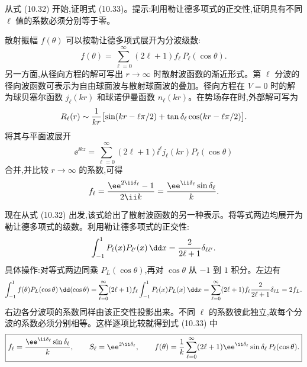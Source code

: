 \begin{question}
从式 (10.32) 开始,证明式 (10.33)。提示:利用勒让德多项式的正交性,证明具有不同 $\ell$ 值的系数必须分别等于零。

\par\smallskip
{}

\begin{solution}
散射振幅 $f(\theta)$ 可以按勒让德多项式展开为分波级数:
\[
f(\theta)=\sum_{\ell=0}^{\infty}(2\ell+1)f_\ell\,P_\ell(\cos\theta).
\]
另一方面,从径向方程的解可写出 $r\to\infty$ 时散射波函数的渐近形式。第 $\ell$ 分波的径向波函数可表示为自由球面波与散射球面波的叠加。径向方程在 $V=0$ 时的解为球贝塞尔函数 $j_\ell(kr)$ 和球诺伊曼函数 $n_\ell(kr)$。在势场存在时,外部解可写为
\[
R_\ell(r)\sim {1\over kr}\bigl[\sin(kr-\ell\pi/2)+\tan\delta_\ell\cos(kr-\ell\pi/2)\bigr].
\]
将其与平面波展开
\[
\ee^{\ii kz}=\sum_{\ell=0}^{\infty}(2\ell+1)\ii^\ell j_\ell(kr)P_\ell(\cos\theta)
\]
合并,并比较 $r\to\infty$ 的系数,可得
\[
f_\ell={\ee^{2\ii\delta_\ell}-1\over2\ii k}={\ee^{\ii\delta_\ell}\sin\delta_\ell\over k}.
\]

现在从式 (10.32) 出发,该式给出了散射波函数的另一种表示。将等式两边均展开为勒让德多项式的级数。利用勒让德多项式的正交性:
\[
\int_{-1}^{1}P_\ell(x)P_{\ell'}(x)\,\dd x={2\over2\ell+1}\delta_{\ell\ell'}.
\]
具体操作:对等式两边同乘 $P_L(\cos\theta)$,再对 $\cos\theta$ 从 $-1$ 到 $1$ 积分。左边有
\[
\int_{-1}^1 f(\theta)P_L(\cos\theta)\,\dd(\cos\theta)
=\sum_{\ell=0}^\infty(2\ell+1)f_\ell\int_{-1}^1 P_\ell(x)P_L(x)\,\dd x
=\sum_{\ell=0}^\infty(2\ell+1)f_\ell{2\over2\ell+1}\delta_{\ell L}=2f_L.
\]
右边各分波项的系数同样由该正交性投影出来。不同 $\ell$ 的系数彼此独立,故每个分波的系数必须分别相等。这样逐项比较就得到式 (10.33) 中
\[
\boxed{f_\ell={\ee^{\ii\delta_\ell}\sin\delta_\ell\over k},\qquad S_\ell=\ee^{2\ii\delta_\ell},\qquad f(\theta)={1\over k}\sum_{\ell=0}^\infty(2\ell+1)\ee^{\ii\delta_\ell}\sin\delta_\ell\,P_\ell(\cos\theta).}
\]
\end{solution}
\end{question}

